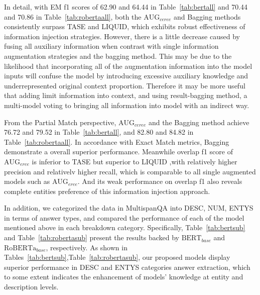 \documentclass[mathematics,article,submit,moreauthors]{Definitions/mdpi}
\newcommand{\1}[1]{\mathds{1}\left[#1\right]}
\begin{document}
	In detail, with EM f1 scores of 62.90 and 64.44 in Table~\ref{tab:bertall} and 70.44 and 70.86 in Table~\ref{tab:robertaall}, both the $\text{AUG}_{ceree}$ and Bagging methods consistently surpass TASE and LIQUID, which exhibits robust effectiveness of information injection strategies. However, there is a little decrease caused by fusing all auxiliary information when contrast with single information augmentation strategies and the bagging method. This may be due to the likelihood that incorporating all of the augmentation information into the model inputs will confuse the model by introducing excessive auxiliary knowledge and underrepresented original context proportion. Therefore it may be more useful that adding limit information into context, and using result-bagging method, a multi-model voting to bringing all information into model with an indirect way.
	
	From the Partial Match perspective, $\text{AUG}_{ceree}$ and the Bagging method achieve 76.72 and 79.52 in Table~\ref{tab:bertall}, and 82.80 and 84.82 in Table~\ref{tab:robertaall}. In accordance with Exact Match metrics, Bagging demonstrate a overall superior performance. Meanwhile overlap f1 score of $\text{AUG}_{eree}$ is inferior to TASE but superior to LIQUID ,with relatively higher precision and relativelv higher recall, which  is comparable to all single augmented models such as $\text{AUG}_{eree}$. And its weak performance on overlap f1 also reveals complete entities preference of this information injection approach.
	
	In addition, we	categorized the data in MultispanQA into DESC, NUM, ENTYS in terms of answer types, and compared the performance of each of the model mentioned above in each breakdown category. Specifically,  Table~\ref{tab:bertsub} and Table~\ref{tab:robertasub} present the results backed by  $\text{BERT}_{base}$ and $\text{RoBERTa}_{base}$, respectively. As shown in Tables~\ref{tab:bertsub},Table~\ref{tab:robertasub}, our proposed models display superior performance in DESC and ENTYS categories answer extraction, which to some extent indicates the enhancement of models' knowledge at entity and description levels.
	
\end{document}
